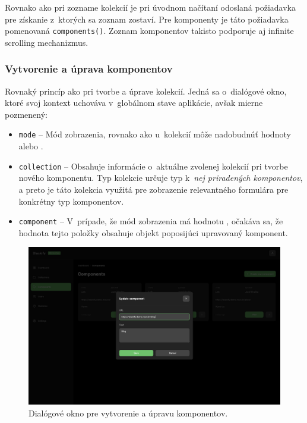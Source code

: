 \noindent Rovnako ako pri zozname kolekcií je pri úvodnom načítaní odoslaná požiadavka pre získanie z~ktorých sa zoznam zostaví. Pre komponenty je táto požiadavka pomenovaná \texttt{components()}. Zoznam komponentov takisto podporuje aj infinite scrolling mechanizmus.

\subsubsection{Vytvorenie a úprava komponentov}
Rovnaký princíp ako pri tvorbe a úprave kolekcií. Jedná sa o~dialógové okno, ktoré svoj kontext uchováva v~globálnom stave aplikácie, avšak mierne pozmenený:

\begin{itemize}
	\item \texttt{mode} -- Mód zobrazenia, rovnako ako u~kolekcií môže nadobudnúť hodnoty  alebo .
	\item \texttt{collection} -- Obsahuje informácie o~aktuálne zvolenej kolekcií pri tvorbe nového komponentu. Typ kolekcie určuje typ k~\emph{nej priradených komponentov}, a preto je táto kolekcia využitá pre zobrazenie relevantného formulára pre konkrétny typ komponentov.
	\item \texttt{component} -- V~prípade, že mód zobrazenia má hodnotu , očakáva sa, že hodnota tejto položky obsahuje objekt poposijúci upravovaný komponent.
\end{itemize}

\begin{figure}[h]
	\centering
	\includegraphics[scale=0.085]{obrazky-figures/screenshot_component_update}
	\caption{Dialógové okno pre vytvorenie a úpravu komponentov.}
\end{figure}

